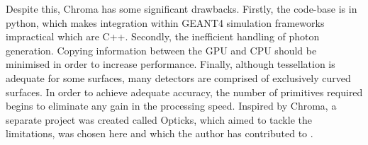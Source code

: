 \par
Despite this, Chroma has some significant drawbacks.
Firstly, the code-base is in python, which makes integration within GEANT4 simulation frameworks impractical which are C++.
Secondly, the inefficient handling of photon generation.
Copying information between the GPU and CPU should be minimised in order to increase performance.
Finally, although tessellation is adequate for some surfaces, many detectors are comprised of exclusively curved surfaces.
In order to achieve adequate accuracy, the number of primitives required begins to eliminate any gain in the processing speed.
Inspired by Chroma, a separate project was created called Opticks, which aimed to tackle the limitations, was chosen here and which the author has contributed to \cite{Opticks_Paper_2017_ref,Opticks_CHEP_2019_ref,Opticks_CHEP_2021_ref}.

